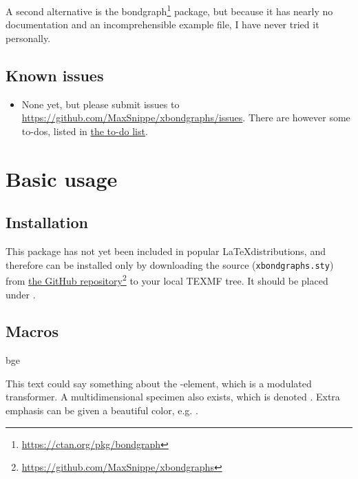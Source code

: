 		A second alternative is the \textsf{bondgraph}\footnote{\url{https://ctan.org/pkg/bondgraph}} package, but because it has nearly no documentation and an incomprehensible example file, I have never tried it personally.
		
	\subsection{Known issues}
		
		\begin{itemize}
			\item None yet, but please submit issues to \url{https://github.com/MaxSnippe/xbondgraphs/issues}. There are however some to-dos, listed in \hyperlink{sec:todolist}{the to-do list}.
		\end{itemize}

\section{Basic usage}
	
	\subsection{Installation}
		This package has not yet been included in popular \LaTeX distributions, and therefore can be installed only by downloading the source (\texttt{xbondgraphs.sty}) from \href{https://github.com/MaxSnippe/xbondgraphs}{the GitHub repository}\footnote{\url{https://github.com/MaxSnippe/xbondgraphs}} to your local TEXMF tree. It should be placed under .
        
    \subsection{Macros}
        
        \begin{docCommand}{bge}{}
            
\begin{dispExample}
This text could say something about the -element, which is a
modulated transformer. A multidimensional specimen also exists, which is
denoted . Extra emphasis can be given a beautiful 
color, e.g. .
\end{dispExample}
        \end{docCommand}
        
